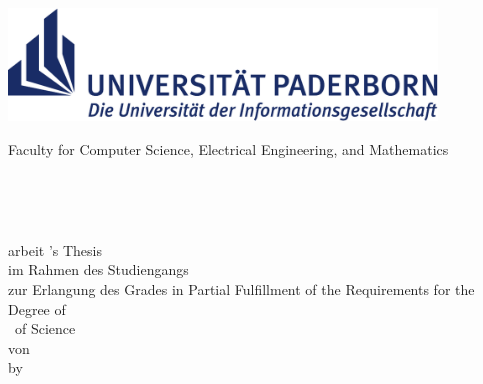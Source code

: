 
\thispagestyle{empty}
\begin{titlepage}
\begin{center}
    \vspace{-3cm}
    \begin{minipage}{14cm}
        \hspace*{1.9cm}
        \includegraphics[height=3cm]{figures/upb_logo}\\
        \begin{minipage}{15.5cm}
            \hspace*{1.9cm}
            \vspace*{5pt}
            \textsf{\noindent
            Faculty for Computer Science, Electrical Engineering, and
            Mathematics
            }
        \end{minipage}
    \end{minipage}\\[40pt]

    \vspace{-0.3cm}
    \begin{doublespace}
        {\Huge\textbf{\Title}}\\[30pt]
    \end{doublespace}

    {\Large
        \ifgerman
            \Degree arbeit
        \else
            \Degree's\hspace{0.5mm} Thesis
        \fi
    }\\[6pt]
        \ifgerman
            im Rahmen des Studiengangs \degreeprogramm\\
            zur Erlangung des Grades
        \else
            in Partial Fulfillment of the Requirements for the\\
            Degree of
        \fi
        \\[6pt]
    {\Large \Degree\ of Science}\\[44pt] %

    \ifgerman
        von\\
    \else
        by\\
    \fi
    {\scshape\large \Author\\\small\Address}\\[44pt]


\end{center}
\end{titlepage}
